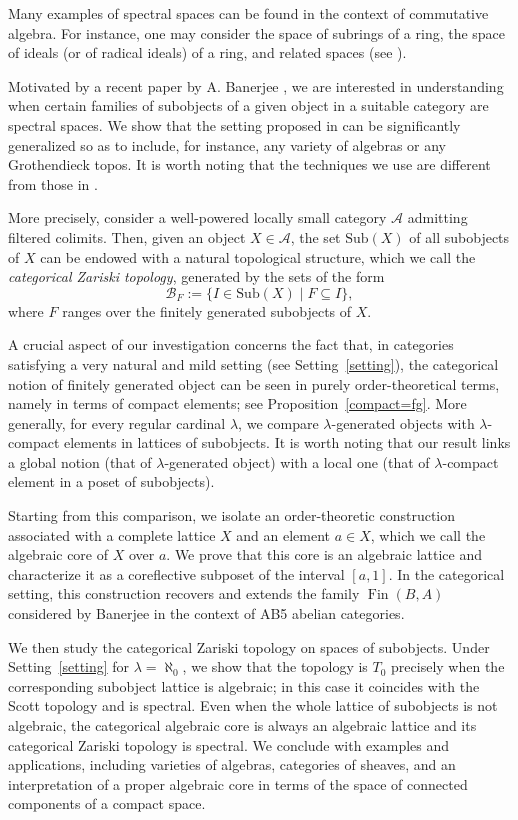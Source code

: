 \documentclass{amsproc}
\theoremstyle{definition}
\theoremstyle{plain}
\theoremstyle{remark}
\numberwithin{equation}{section}
\newcommand{\sub}[1]{\mathrm{Sub} (#1)}
\newcommand{\Fin}{\operatorname{Fin}}
\begin{document}
Many examples of spectral spaces can be found in the context of commutative algebra. For instance, one may consider the space of subrings of a ring, the space of ideals (or of radical ideals) of a ring, and related spaces (see \cite{finocchiaro-ultrafiltri,top-vers-null,fi-fo-sp-dist,olberding_irredundant}).

Motivated by a recent paper by A. Banerjee \cite{Banerjee}, we are interested in understanding when certain families of subobjects of a given object in a suitable category are spectral spaces. We show that the setting proposed in \cite{Banerjee} can be significantly generalized so as to include, for instance, any variety of algebras or any Grothendieck topos. It is worth noting that the techniques we use are different from those in \cite{Banerjee}.

More precisely, consider a well-powered locally small category $\mathscr A$ admitting filtered colimits. Then, given an object $X \in \mathscr{A}$, the set $\sub X$ of all subobjects of $X$ can be endowed with a natural topological structure, which we call the {\em categorical Zariski topology}, generated by the sets of the form
$$
\mathcal B_F:=\{I\in \sub X\mid F\subseteq I\},
$$
where $F$ ranges over the finitely generated subobjects of $X$.

A crucial aspect of our investigation concerns the fact that, in categories satisfying a very natural and mild setting (see Setting~\ref{setting}), the categorical notion of finitely generated object can be seen in purely order-theoretical terms, namely in terms of compact elements; see Proposition~\ref{compact=fg}. More generally, for every regular cardinal $\lambda$, we compare $\lambda$-generated objects with $\lambda$-compact elements in lattices of subobjects. It is worth noting that our result links a global notion (that of $\lambda$-generated object) with a local one (that of $\lambda$-compact element in a poset of subobjects).

Starting from this comparison, we isolate an order-theoretic construction associated with a complete lattice $X$ and an element $a\in X$, which we call the algebraic core of $X$ over $a$. We prove that this core is an algebraic lattice and characterize it as a coreflective subposet of the interval $[a,1]$. In the categorical setting, this construction recovers and extends the family $\Fin(B,A)$ considered by Banerjee in the context of AB5 abelian categories.

We then study the categorical Zariski topology on spaces of subobjects. Under Setting~\ref{setting} for $\lambda=\aleph_0$, we show that the topology is $T_0$ precisely when the corresponding subobject lattice is algebraic; in this case it coincides with the Scott topology and is spectral. Even when the whole lattice of subobjects is not algebraic, the categorical algebraic core is always an algebraic lattice and its categorical Zariski topology is spectral. We conclude with examples and applications, including varieties of algebras, categories of sheaves, and an interpretation of a proper algebraic core in terms of the space of connected components of a compact space.
\end{document}
